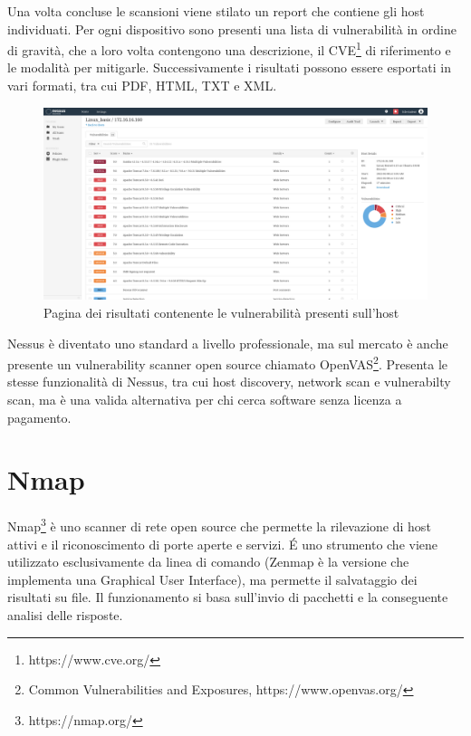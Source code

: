 \documentclass[12pt]{report}
\begin{document}
Una volta concluse le scansioni viene stilato un report che contiene gli host individuati. Per ogni dispositivo sono presenti una lista di vulnerabilità in ordine di gravità, che a loro volta contengono una descrizione, il CVE\footnote{https://www.cve.org/} di riferimento e le modalità per mitigarle. Successivamente i risultati possono essere esportati in vari formati, tra cui PDF, HTML, TXT e XML.

\begin{figure}[htbp]
	\centering
	\includegraphics[width = 36em]{immagini/nessus_scan.png}
	\caption{Pagina dei risultati contenente le vulnerabilità presenti sull'host}
	\label{fig:nessus_scan}
\end{figure}

Nessus è diventato uno standard a livello professionale, ma sul mercato è anche presente un vulnerability scanner open source chiamato OpenVAS\footnote{Common Vulnerabilities and Exposures, https://www.openvas.org/}. Presenta le stesse funzionalità di Nessus, tra cui host discovery, network scan e vulnerabilty scan, ma è una valida alternativa per chi cerca software senza licenza a pagamento.

\section{Nmap}

Nmap\footnote{https://nmap.org/} è uno scanner di rete open source che permette la rilevazione di host attivi e il riconoscimento di porte aperte e servizi. \'{E} uno strumento che viene utilizzato esclusivamente da linea di comando (Zenmap è la versione che implementa una Graphical User Interface), ma permette il salvataggio dei risultati su file. Il funzionamento si basa sull'invio di pacchetti e la conseguente analisi delle risposte. 
\end{document}
